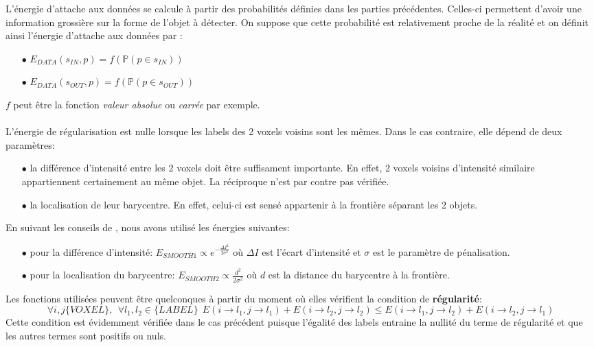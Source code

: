 \documentclass{article}
\begin{document}
L'énergie d'attache aux données se calcule à partir des probabilités définies dans les parties précédentes. Celles-ci permettent d'avoir une information grossière sur la forme de l'objet à détecter. On suppose que cette probabilité est relativement proche de la réalité et on définit ainsi l'énergie d'attache aux données par :
\begin{center}
\begin{itemize}
	\item[$\bullet$] $E_{DATA}(s_{IN}, p) = f(\mathbb{P}(p \in s_{IN}))$
	\item[$\bullet$] $E_{DATA}(s_{OUT}, p) =f( \mathbb{P}(p \in s_{OUT}))$
\end{itemize}
\end{center}
$f$ peut être la fonction \textit{valeur absolue} ou \textit{carrée} par exemple.
\\
\\
L'énergie de régularisation est nulle lorsque les labels des 2 voxels voisins sont les mêmes. Dans le cas contraire, elle dépend de deux paramètres:
\begin{itemize}
	\item[$\bullet$] la différence d'intensité entre les 2 voxels doit être suffisament importante. En effet, 2 voxels voisins d'intensité similaire appartiennent certainement au même objet. La réciproque n'est par contre pas vérifiée.
	\item[$\bullet$] la localisation de leur barycentre. En effet, celui-ci est sensé appartenir à la frontière séparant les 2 objets.
\end{itemize}
En suivant les conseils de \cite{bib:seg}, nous avons utilisé les énergies suivantes:
\begin{itemize}
	\item[$\bullet$] pour la différence d'intensité: $E_{SMOOTH 1} \varpropto e^{-\frac{\Delta I^2}{2\sigma^2}}$ où $\Delta I$ est l'écart d'intensité et $\sigma$ est le paramètre de pénalisation.
	\item[$\bullet$] pour la localisation du barycentre: $E_{SMOOTH 2} \varpropto  \frac{d^2}{2\sigma^2}$ où $d$ est la distance du barycentre à la frontière.
\end{itemize}
Les fonctions utilisées peuvent être quelconques à partir du moment où elles vérifient la condition de \textbf{régularité}:
\begin{equation*}
\forall i, j \{VOXEL\}, \ \ \forall l_1, l_2 \in \{LABEL\}\ \  E(i\rightarrow l_1, j\rightarrow l_1) + E(i\rightarrow l_2, j\rightarrow l_2) \leq E(i\rightarrow l_1, j\rightarrow l_2) + E(i\rightarrow l_2, j\rightarrow l_1)
\end{equation*}
Cette condition est évidemment vérifiée dans le cas précédent puisque l'égalité des labels entraine la nullité du terme de régularité et que les autres termes sont positifs ou nuls.

\end{document}
